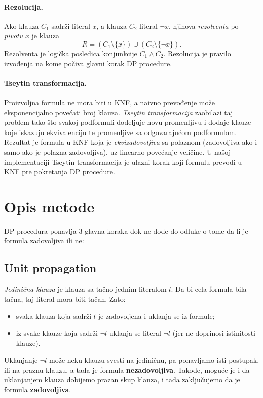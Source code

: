 \documentclass[a4paper,10pt]{article}
\begin{document}
\paragraph{Rezolucija.} Ako klauza $C_1$ sadrži literal $x$, a klauza $C_2$ literal $\neg x$, njihova \emph{rezolventa} po \emph{pivotu} $x$ je klauza
\[
  R = (C_1 \setminus \{x\}) \cup (C_2 \setminus \{\neg x\}).
\]
Rezolventa je logička posledica konjunkcije $C_1 \wedge C_2$. Rezolucija je pravilo izvođenja na kome počiva glavni korak DP procedure.

\paragraph{Tseytin transformacija.} Proizvoljna formula ne mora biti u KNF, a naivno prevođenje može eksponencijalno povećati broj klauza. \emph{Tseytin transformacija} zaobilazi taj problem tako što svakoj podformuli dodeljuje novu promenljivu i dodaje klauze koje iskazuju ekvivalenciju te promenljive sa odgovarajućom podformulom. Rezultat je formula u KNF koja je \emph{ekvizadovoljiva} sa polaznom (zadovoljiva ako i samo ako je polazna zadovoljiva), uz linearno povećanje veličine. U našoj implementaciji Tseytin transformacija je ulazni korak koji formulu prevodi u KNF pre pokretanja DP procedure.



\section{Opis metode}
\label{sec:opis_metode}

DP procedura ponavlja 3 glavna koraka dok ne dođe do odluke o tome da li je formula zadovoljiva ili ne:
\subsection{Unit propagation}
\emph{Jedinična klauza} je klauza sa tačno jednim literalom $l$. Da bi cela formula bila tačna, taj literal mora biti tačan. Zato:
\begin{itemize}
  \item svaka klauza koja sadrži $l$ je zadovoljena i uklanja se iz formule;
  \item iz svake klauze koja sadrži $\neg l$ uklanja se literal $\neg l$ (jer ne doprinosi istinitosti klauze).
\end{itemize}

Uklanjanje $\neg l$ može neku klauzu svesti na jediničnu, pa ponavljamo isti postupak, ili na praznu klauzu, a tada je formula \textbf{nezadovoljiva}.
Takođe, moguće je i da uklanjanjem klauza dobijemo prazan skup klauza, i tada zaključujemo da je formula \textbf{zadovoljiva}.
\end{document}

